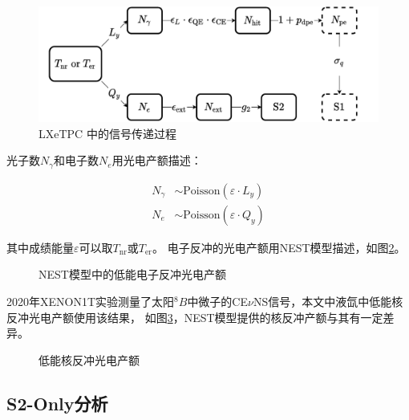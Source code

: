 \begin{figure}
    \centering
    \includegraphics[width=1.0\linewidth]{figures/signal_flow.pdf}
    \caption{\label{fig:signal_flow} LXeTPC 中的信号传递过程}
\end{figure}

光子数$N_\gamma$和电子数$N_e$用光电产额描述：

\begin{align}
    \label{eq:N_ge_lq}
    N_\gamma &\sim \mathrm{Poisson}\left(\varepsilon\cdot L_y\right) \\
    N_e &\sim \mathrm{Poisson}\left(\varepsilon\cdot Q_y\right)
\end{align}

其中成绩能量$\varepsilon$可以取$T_{\mathrm{nr}}$或$T_{\mathrm{er}}$。
电子反冲的光电产额用NEST模型描述，如图\ref{fig:lxe_er_yield}。

\begin{figure}
    \centering
    
    \caption{\label{fig:lxe_er_yield} NEST模型中的低能电子反冲光电产额\cite{lenardo_global_2015,jason_brodsky_chris_tunnell_mszydagis_jbalajth_vetri_velan_junying_huang_2019}}
\end{figure}

2020年XENON1T实验测量了太阳${}^{8}B$中微子的CE$\nu$NS信号\cite{aprile_search_2021}，本文中液氙中低能核反冲光电产额使用该结果，
如图\ref{fig:lxe_nr_yield}，NEST模型提供的核反冲产额与其有一定差异。

\begin{figure}
    \centering
    
    \caption{\label{fig:lxe_nr_yield} 低能核反冲光电产额\cite{aprile_search_2021,jason_brodsky_chris_tunnell_mszydagis_jbalajth_vetri_velan_junying_huang_2019}}
\end{figure}

\subsection{S2-Only分析}

